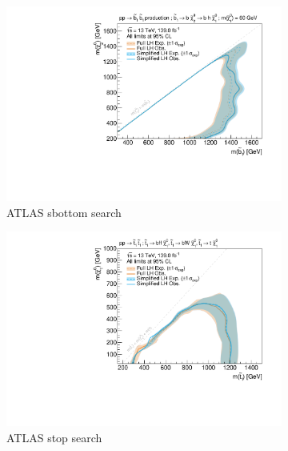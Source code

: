\begin{figure}
	\centering
	\begin{subfigure}[b]{0.5\textwidth}
		\centering\includegraphics[width=\textwidth]{exclusion_sbottom_noLabel_v2}
		\caption{ATLAS sbottom search~\cite{SUSY-2018-31}\label{fig:results_sbottom}}
	\end{subfigure}\hfill
	\begin{subfigure}[b]{0.5\textwidth}
		\centering\includegraphics[width=\textwidth]{exclusion_stop1L_noLabel_v2}
		\caption{ATLAS stop search\label{fig:results_stop1L}}
	\end{subfigure}\hfill
	\par\medskip
	\begin{subfigure}[b]{0.5\textwidth}

\end{subfigure}
\end{figure}
